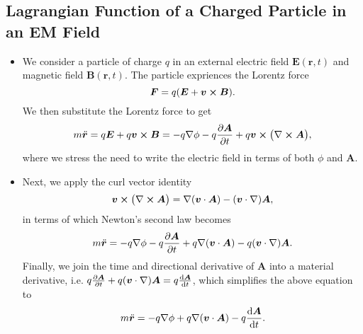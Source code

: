 \documentclass[11pt, a4paper]{article}
\renewcommand{\vec}[1]{\bm{#1}} %
\renewcommand{\r}{\vec{r}}
\newcommand{\E}{\vec{E}} %
\newcommand{\B}{\vec{B}} %
\newcommand{\A}{\vec{A}} %
\renewcommand{\curl}{\nabla \cross}
\renewcommand{\grad}{\nabla}
\begin{document}
\subsection{Lagrangian Function of a Charged Particle in an EM Field}
\begin{itemize}
    \item We consider a particle of charge $ q $ in an external electric field $ \E(\r, t) $ and magnetic field $ \B(\r, t) $. The particle expriences the Lorentz force
    \begin{equation*}
        \vec{F} = q(\E + \vec{v}\cross \B).
    \end{equation*}
    We then substitute the Lorentz force to get
    \begin{equation*}
        m \ddot{\vec{r}} = q\E + q \vec{v} \cross \B = - q\grad \phi - q \pdv{\A}{t} + q \vec{v}\cross \big( \curl \A \big),
    \end{equation*}
    where we stress the need to write the electric field in terms of both $ \phi $ and $ \A $. 

    \item Next, we apply the curl vector identity
    \begin{equation*}
        \vec{v}\cross \big( \curl \A \big) = \grad ( \vec{v}\cdot \A) - ( \vec{v}\cdot \grad)\A,
    \end{equation*}
    in terms of which Newton's second law becomes
    \begin{equation*}
        m \ddot{\vec{r}} = - q \grad \phi - q \pdv{\A}{t} + q \grad ( \vec{v}\cdot \A) - q( \vec{v} \cdot \grad)\A.
    \end{equation*}
    Finally, we join the time and directional derivative of $ \A $ into a material derivative, i.e. $ q \pdv{\A}{t} + q(\vec{v}\cdot \grad)\A = q \dv{\A}{t}$, which simplifies the above equation to
    \begin{equation*}
        m \ddot{\vec{r}} = -q \grad \phi + q \grad ( \vec{v} \cdot \A) - q \dv{\A}{t}.
    \end{equation*}
    

\end{itemize}
\end{document}
